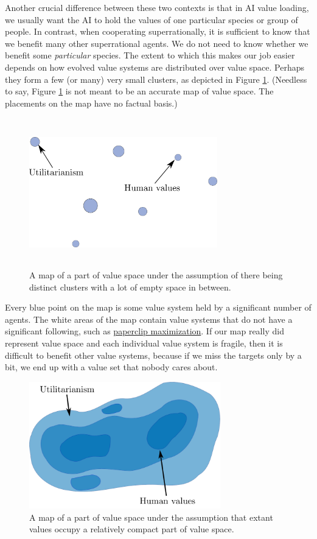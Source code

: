 Another crucial difference between these two contexts is that in AI
value loading, we usually want the AI to hold the values of one
particular species or group of people. In contrast, when cooperating
superrationally, it is sufficient to know that we benefit many other
superrational agents. We do not need to know whether we benefit some
\emph{particular} species. The extent to which this makes our job easier
depends on how evolved value systems are distributed over value space.
Perhaps they form a few (or many) very small clusters, as depicted in
Figure \ref{map-of-value-space-with-clusters}.
(Needless to say, Figure
\ref{map-of-value-space-with-clusters} is not meant to
be an accurate map of value space. The placements on the map have no
factual basis.)

\begin{figure}
    \centering
    \includegraphics[width=3.21875in,height=2.54167in]{figs/map-of-value-space-with-clusters.pdf}
    \caption{A map of a part of value
space under the assumption of there being distinct clusters with a lot
of empty space in between.}
    \label{map-of-value-space-with-clusters}
\end{figure}

Every blue point on the map is some value system held by a significant
number of agents. The white areas of the map contain value systems that
do not have a significant following, such as
\href{https://wiki.lesswrong.com/wiki/Paperclip_maximizer}{paperclip
maximization}. If our map really did represent value space and each
individual value system is fragile, then it is difficult to benefit
other value systems, because if we miss the targets only by a bit, we
end up with a value set that nobody cares about.

\begin{figure}
    \centering
    \includegraphics[width=3.26772in]{figs/map-of-value-space-compact.pdf}
    \caption{A map of a part of value space under the assumption that extant values occupy a
    relatively compact part of value space.}
    \label{map-of-value-space-compact}
\end{figure}

